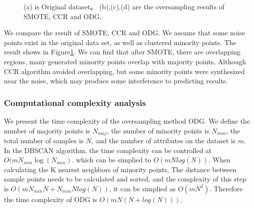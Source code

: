 \documentclass[runningheads]{llncs}
\begin{document}
\begin{figure}[htbp]
  \centering
  \quad
  \quad
  \quad
  \caption{(a) is Original dataset。
  (b),(c),(d) are the oversampling results of SMOTE, CCR and ODG.}
  \label{fig18}
  \end{figure}
We compare the result of SMOTE, CCR and ODG. We assume that some noise points exist in the original data set, 
as well as  clustered minority points. The result shows in Figure\ref{fig18}. 
We can find that after SMOTE, there are overlapping regions, many generated minority points 
overlap with majority points.
Although CCR algorithm avoided overlapping, 
but some minority points were synthesized near the noise, which may produce some interference to predicting results.

\subsubsection{Computational complexity analysis}
We present the time complexity of the oversampling method ODG.
We define the number of majority points is $N_{maj}$, 
the number of minority points is $N_{min}$, the total number of samples is $N$, 
and the number of attributes on the dataset is $m$.
In the DBSCAN algorithm, the time complexity can be controlled at $O(mN_{min}\log(N_{min})$.
which can be simplied to $O(mNlog(N))$.
When calculating the K nearest neighbors of minority points,
The distance between sample points needs to be calculated and sorted, and the complexity of this step is
$O(mN_{min}N+N_{min}Nlog(N))$, it can be simplied as $O(mN^2)$. Therefore the time complexity of
ODG is $O(mN(N+log(N)))$.
\end{document}
